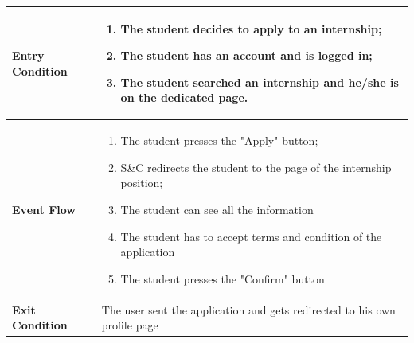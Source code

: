\begin{enumerate}[label=\textbf{[US\arabic*]}, left = 0pt, align = left, resume]
\begin{longtable}{|l|p{11cm}|}
                \textbf{Entry Condition} & 
                    \begin{enumerate}[label=\textbullet, itemsep=0em]
                        \item The student decides to apply to an internship;
                        \item The student has an account and is logged in;
                        \item The student searched an internship and he/she is on the dedicated page.
                    \end{enumerate} \\
                \hline
                
                \textbf{Event Flow} &
                    \begin{enumerate}[label=\arabic*., itemsep=0.2em]
                        \item The student presses the "Apply" button;
                        \item S\&C redirects the student to the page of the internship position;
                        \item The student can see all the information
                        \item The student has to accept terms and condition of the application
                        \item The student presses the "Confirm" button
                    \end{enumerate} \\
                \hline
                
                \textbf{Exit Condition} & 
                    The user sent the application and gets redirected to his own profile page\\
                \hline
                

\end{longtable}
\end{enumerate}
